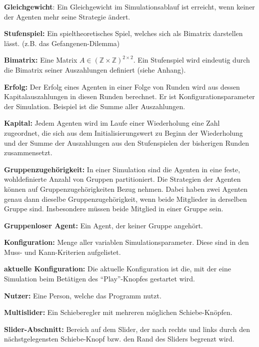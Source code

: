 \documentclass[parskip=full,11pt]{scrartcl}
\begin{document}
\printnoidxglossaries

\textbf{Gleichgewicht}:
Ein Gleichgewicht im Simulationsablauf ist erreicht, wenn keiner der Agenten mehr seine Strategie ändert.

\textbf{Stufenspiel:}
Ein spieltheoretisches Spiel, welches sich als Bimatrix darstellen lässt. (z.B. das Gefangenen-Dilemma)

\textbf{Bimatrix:}
Eine Matrix \(A \in (\mathbb{Z} \times \mathbb{Z})^{2 \times 2}\). Ein Stufenspiel wird eindeutig durch die Bimatrix seiner Auszahlungen definiert (siehe Anhang).

\textbf{Erfolg:}
Der Erfolg eines Agenten in einer Folge von Runden wird aus dessen Kapitalauszahlungen in diesen Runden berechnet. Er ist Konfigurationsparameter der Simulation. Beispiel ist die Summe aller Auszahlungen.

\textbf{Kapital:}
Jedem Agenten wird im Laufe einer Wiederholung eine Zahl zugeordnet, die sich aus dem Initialisierungswert zu Beginn der Wiederholung und der Summe der Auszahlungen aus den Stufenspielen der bisherigen Runden zusammensetzt.

\textbf{Gruppenzugehörigkeit:}
In einer Simulation sind die Agenten in eine feste, wohldefinierte Anzahl von Gruppen partitioniert. Die Strategien der Agenten können auf Gruppenzugehörigkeiten Bezug nehmen. Dabei haben zwei Agenten genau dann dieselbe Gruppenzugehörigkeit, wenn beide Mitglieder in derselben Gruppe sind. Insbesondere müssen beide Mitglied in einer Gruppe sein.

\textbf{Gruppenloser Agent:}
Ein Agent, der keiner Gruppe angehört.

\textbf{Konfiguration:}
Menge aller variablen Simulationsparameter. Diese sind in den Muss- und Kann-Kriterien aufgelistet.

\textbf{aktuelle Konfiguration:}
Die aktuelle Konfiguration ist die, mit der eine Simulation beim Betätigen des \enquote{Play}-Knopfes gestartet wird.

\textbf{\Gls{Nutzer}:}
Eine Person, welche das Programm nutzt.

\textbf{\Gls{Multislider}:}
Ein Schieberegler mit mehreren möglichen Schiebe-Knöpfen.

\textbf{\Gls{Slider-Abschnitt}:}
Bereich auf dem Slider, der nach rechts und links durch den nächstgelegensten Schiebe-Knopf bzw. den Rand des Sliders begrenzt wird.
\end{document}
